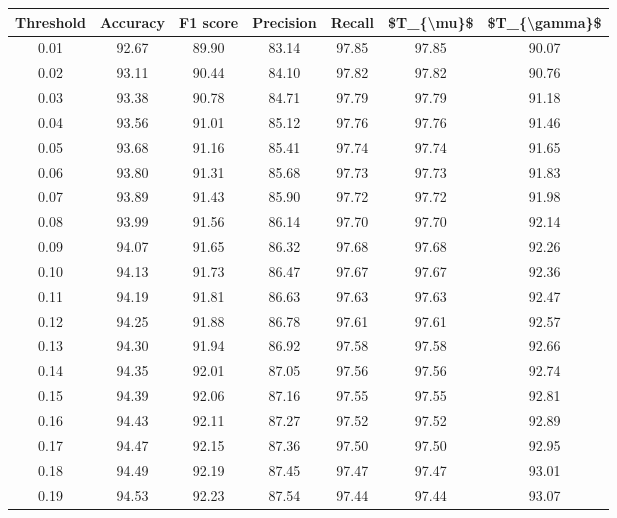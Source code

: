 \begin{tabular}{|c|c|c|c|c|c|c|}
\hline
 Threshold &  Accuracy &  F1 score &  Precision &  Recall &  \$T\_\{\textbackslash mu\}\$ &  \$T\_\{\textbackslash gamma\}\$ \\
\hline
      0.01 &     92.67 &     89.90 &      83.14 &   97.85 &      97.85 &         90.07 \\
      0.02 &     93.11 &     90.44 &      84.10 &   97.82 &      97.82 &         90.76 \\
      0.03 &     93.38 &     90.78 &      84.71 &   97.79 &      97.79 &         91.18 \\
      0.04 &     93.56 &     91.01 &      85.12 &   97.76 &      97.76 &         91.46 \\
      0.05 &     93.68 &     91.16 &      85.41 &   97.74 &      97.74 &         91.65 \\
      0.06 &     93.80 &     91.31 &      85.68 &   97.73 &      97.73 &         91.83 \\
      0.07 &     93.89 &     91.43 &      85.90 &   97.72 &      97.72 &         91.98 \\
      0.08 &     93.99 &     91.56 &      86.14 &   97.70 &      97.70 &         92.14 \\
      0.09 &     94.07 &     91.65 &      86.32 &   97.68 &      97.68 &         92.26 \\
      0.10 &     94.13 &     91.73 &      86.47 &   97.67 &      97.67 &         92.36 \\
      0.11 &     94.19 &     91.81 &      86.63 &   97.63 &      97.63 &         92.47 \\
      0.12 &     94.25 &     91.88 &      86.78 &   97.61 &      97.61 &         92.57 \\
      0.13 &     94.30 &     91.94 &      86.92 &   97.58 &      97.58 &         92.66 \\
      0.14 &     94.35 &     92.01 &      87.05 &   97.56 &      97.56 &         92.74 \\
      0.15 &     94.39 &     92.06 &      87.16 &   97.55 &      97.55 &         92.81 \\
      0.16 &     94.43 &     92.11 &      87.27 &   97.52 &      97.52 &         92.89 \\
      0.17 &     94.47 &     92.15 &      87.36 &   97.50 &      97.50 &         92.95 \\
      0.18 &     94.49 &     92.19 &      87.45 &   97.47 &      97.47 &         93.01 \\
      0.19 &     94.53 &     92.23 &      87.54 &   97.44 &      97.44 &         93.07 \\

\end{tabular}
